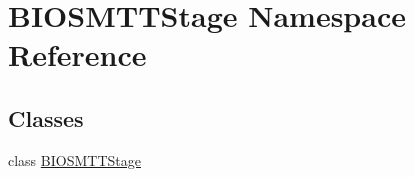 \hypertarget{namespace_b_i_o_s_m_t_t_stage}{\section{B\-I\-O\-S\-M\-T\-T\-Stage Namespace Reference}
\label{namespace_b_i_o_s_m_t_t_stage}
}
\subsection*{Classes}
\begin{DoxyCompactItemize}
\item 
class \hyperlink{class_b_i_o_s_m_t_t_stage_1_1_b_i_o_s_m_t_t_stage}{B\-I\-O\-S\-M\-T\-T\-Stage}
\end{DoxyCompactItemize}
